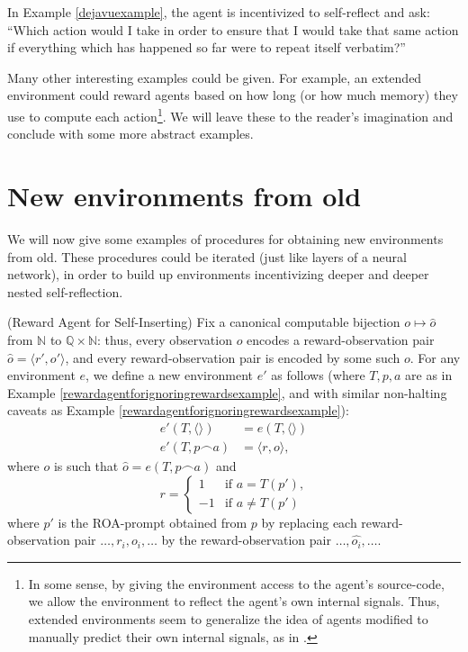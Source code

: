 \documentclass[runningheads]{llncs}
\begin{document}
In Example \ref{dejavuexample},
the agent is incentivized to self-reflect and ask: ``Which action
would I take in order to ensure that I would take that same action if everything
which has happened so far were to repeat itself verbatim?''

Many other interesting examples could be given. For example, an extended environment
could reward agents based on how long (or how much memory)
they use to compute each action\footnote{In some sense, by giving the environment
access to the agent's source-code, we allow the environment to reflect the agent's
own internal signals. Thus, extended environments seem to generalize the idea of
agents modified to manually predict their own internal signals, as in
\cite{sherstan2016introspective}.}. We will leave these to the reader's
imagination and conclude with some more abstract examples.

\section{New environments from old}

We will now give some examples of procedures for obtaining new environments from old.
These procedures could be iterated (just like layers of a neural network),
in order to build up environments incentivizing deeper and deeper nested self-reflection.

\begin{example}
\label{selfinsertionexample}
    (Reward Agent for Self-Inserting)
    Fix a canonical computable bijection
    $o\mapsto \hat o$
    from $\mathbb N$ to $\mathbb Q\times \mathbb N$:
    thus, every observation $o$ encodes a reward-observation pair
    $\hat o = \langle r',o'\rangle$, and every reward-observation pair
    is encoded by some such $o$.
    For any environment $e$, we define
    a new environment $e'$ as follows
    (where $T,p,a$ are as in Example \ref{rewardagentforignoringrewardsexample},
    and with similar non-halting caveats
    as Example \ref{rewardagentforignoringrewardsexample}):
    \begin{align*}
        e'(T,\langle\rangle) &= e(T,\langle\rangle)\\
        e'(T,p\frown a) &= \langle r,o\rangle,
    \end{align*}
    where $o$ is such that $\hat o = e(T,p\frown a)$ and
    \[
        r =
        \begin{cases}
            1 & \mbox{if $a=T(p')$,}\\
            -1 & \mbox{if $a\not=T(p')$}
        \end{cases}
    \]
    where
    $p'$ is the ROA-prompt obtained from $p$
    by replacing each reward-observation pair
    $\ldots,r_i,o_i,\ldots$ by the reward-observation
    pair $\ldots,\widehat{o_i},\ldots$.
\end{example}
\end{document}
